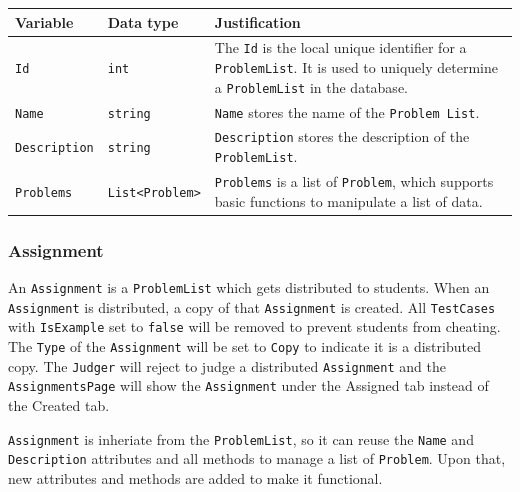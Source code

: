 \documentclass[a4paper]{report}
\begin{document}
\begin{tabulary}{\textwidth}{|l|l|L|}
    \hline
    Variable & Data type & Justification \\
    \hline
    \verb|Id| & \verb|int| & The \verb|Id| is the local unique identifier for a \verb|ProblemList|. It is used to uniquely determine a \verb|ProblemList| in the database. \\
    \hline
    \verb|Name| & \verb|string| & \verb|Name| stores the name of the \verb|Problem List|. \\
    \hline
    \verb|Description| & \verb|string| & \verb|Description| stores the description of the \verb|ProblemList|. \\
    \hline
    \verb|Problems| & \verb|List<Problem>| & \verb|Problems| is a list of \verb|Problem|, which supports basic functions to manipulate a list of data. \\
    \hline
\end{tabulary}

\subsubsection{Assignment}

An \verb|Assignment| is a \verb|ProblemList| which gets distributed to students. When an \verb|Assignment| is distributed, a copy of that \verb|Assignment| is created. All \verb|TestCases| with \verb|IsExample| set to \verb|false| will be removed to prevent students from cheating. The \verb|Type| of the \verb|Assignment| will be set to \verb|Copy| to indicate it is a distributed copy. The \verb|Judger| will reject to judge a distributed \verb|Assignment| and the \verb|AssignmentsPage| will show the \verb|Assignment| under the Assigned tab instead of the Created tab.

\verb|Assignment| is inheriate from the \verb|ProblemList|, so it can reuse the \verb|Name| and \verb|Description| attributes and all methods to manage a list of \verb|Problem|. Upon that, new attributes and methods are added to make it functional.
\end{document}
